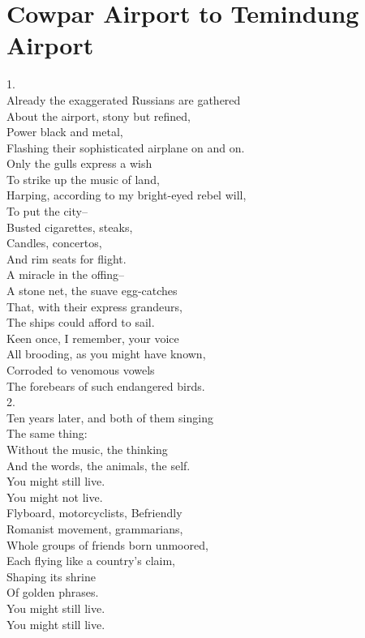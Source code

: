 \documentclass[smalldemyvopaper,11pt,twoside,onecolumn,openright,extrafontsizes]{memoir}
\begin{document}
\chapter{Cowpar Airport to Temindung Airport}
1.
\\Already the exaggerated Russians are gathered
\\About the airport, stony but refined,
\\Power black and metal,
\\Flashing their sophisticated airplane on and on.
\\Only the gulls express a wish
\\To strike up the music of land,
\\Harping, according to my bright-eyed rebel will,
\\To put the city--
\\Busted cigarettes, steaks,
\\Candles, concertos,
\\And rim seats for flight.
\\A miracle in the offing--
\\A stone net, the suave egg-catches
\\That, with their express grandeurs,
\\The ships could afford to sail.
\\Keen once, I remember, your voice
\\All brooding, as you might have known,
\\Corroded to venomous vowels
\\The forebears of such endangered birds.
\\2.
\\Ten years later, and both of them singing
\\The same thing:
\\Without the music, the thinking
\\And the words, the animals, the self.
\\You might still live.
\\You might not live.
\\Flyboard, motorcyclists, Befriendly
\\Romanist movement, grammarians,
\\Whole groups of friends born unmoored,
\\Each flying like a country's claim,
\\Shaping its shrine
\\Of golden phrases.
\\You might still live.
\\You might still live.
\end{document}
